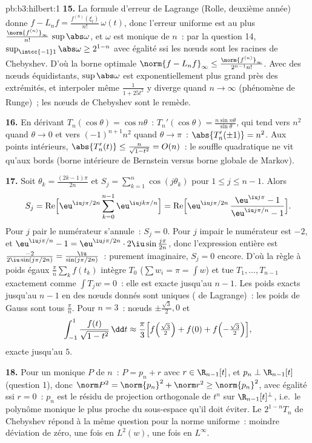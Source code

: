 \begin{solution}{pb:b3:hilbert:1}
\textbf{15.} La formule d'erreur de Lagrange (Rolle, deuxième
année) donne $f - L_nf = \frac{f^{(n)}(\xi_t)}{n!}\,\omega(t)$,
donc l'erreur uniforme est au plus
$\frac{\norm{f^{(n)}}_\infty}{n!}\,\sup\abs\omega$, et
$\omega$ est monique de  $n$~: par la question 14,
$\sup_{\intcc{-1}1}\abs\omega \geq 2^{1-n}$ avec égalité ssi
les nœuds sont les racines de Chebyshev. D'où la borne
optimale $\norm{f - L_nf}_\infty \leq
\frac{\norm{f^{(n)}}_\infty}{2^{n-1}n!}$. Avec des nœuds
équidistants, $\sup\abs\omega$ est exponentiellement plus
grand près des extrémités, et interpoler même $\frac1{1 +
25t^2}$ y diverge quand $n \to \infty$ (phénomène de Runge)~;
les nœuds de Chebyshev sont le remède.

\textbf{16.} En dérivant $T_n(\cos\theta) = \cos n\theta$~:
$T_n'(\cos\theta) = \frac{n\sin n\theta}{\sin\theta}$, qui
tend vers $n^2$ quand $\theta \to 0$ et vers
$(-1)^{n+1}n^2$ quand $\theta \to \pi$~:
$\abs{T_n'(\pm1)} = n^2$. Aux points intérieurs,
$\abs{T_n'(t)} \leq \frac{n}{\sqrt{1 - t^2}} = O(n)$~: le
souffle quadratique ne vit qu'aux bords (borne intérieure de
Bernstein versus borne globale de Markov).

\textbf{17.} Soit $\theta_k = \frac{(2k-1)\pi}{2n}$ et $S_j
= \sum_{k=1}^n\cos(j\theta_k)$ pour $1 \leq j \leq n-1$.
Alors
\[
S_j = \operatorname{Re}\Bigl[\eu^{\iu j\pi/2n}
\sum_{k=0}^{n-1}\eu^{\iu jk\pi/n}\Bigr]
= \operatorname{Re}\Bigl[\eu^{\iu j\pi/2n}\,
\frac{\eu^{\iu j\pi} - 1}{\eu^{\iu j\pi/n} - 1}\Bigr] .
\]
Pour $j$ pair le numérateur s'annule~: $S_j = 0$. Pour $j$
impair le numérateur est $-2$, et $\eu^{\iu j\pi/n} - 1 =
\eu^{\iu j\pi/2n}\cdot2\iu\sin\frac{j\pi}{2n}$, donc
l'expression entière est $\frac{-2}{2\iu\sin(j\pi/2n)} =
\frac{\iu}{\sin(j\pi/2n)}$~: purement imaginaire, $S_j = 0$
encore. D'où la règle à poids égaux $\frac\pi
n\sum_kf(t_k)$ intègre $T_0$ ($\sum w_i = \pi = \int w$) et
tue $T_1, \dots, T_{n-1}$ exactement comme $\int T_jw = 0$~:
elle est exacte jusqu'au  $n - 1$. Les poids exacts
jusqu'au  $n-1$ en des nœuds donnés sont uniques (
de Lagrange)~: les poids de Gauss sont tous $\frac\pi n$.
Pour $n = 3$~: nœuds $\pm\frac{\sqrt3}2, 0$ et
\[
\int_{-1}^1\frac{f(t)}{\sqrt{1 - t^2}}\,\dd t \approx
\frac\pi3\Bigl[f\Bigl(\tfrac{\sqrt3}2\Bigr) + f(0) +
f\Bigl(-\tfrac{\sqrt3}2\Bigr)\Bigr],
\]
exacte jusqu'au  $5$.

\textbf{18.} Pour un monique $P$ de  $n$~: $P = p_n + r$
avec $r \in \R_{n-1}[t]$, et $p_n \perp \R_{n-1}[t]$
(question 1), donc $\norm P^2 = \norm{p_n}^2 + \norm r^2 \geq
\norm{p_n}^2$, avec égalité ssi $r = 0$~: $p_n$ est le
résidu de projection orthogonale de $t^n$ sur
$\R_{n-1}[t]^\perp$, i.e.\ le polynôme monique le plus
proche du sous-espace qu'il doit éviter. Le $2^{1-n}T_n$ de
Chebyshev répond à la même question pour la norme uniforme~:
moindre déviation de zéro, une fois en $L^2(w)$, une fois en
$L^\infty$.


\end{solution}
